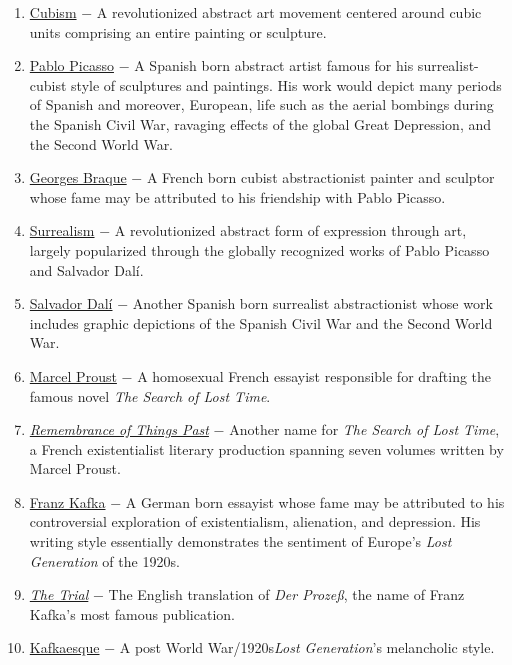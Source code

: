 \documentclass[12pt]{article}
\begin{document}
\begin{flushleft}
\begin{enumerate}
\item \underline{Cubism} $-$ A revolutionized abstract art movement centered around cubic units comprising an entire painting or sculpture.

\item \underline{Pablo Picasso} $-$ A Spanish born abstract artist famous for his surrealist-cubist style of sculptures and paintings. His work would depict many periods of Spanish and moreover, European, life such as the aerial bombings during the Spanish Civil War, ravaging effects of the global Great Depression, and the Second World War.

\item \underline{Georges Braque} $-$ A French born cubist abstractionist painter and sculptor whose fame may be attributed to his friendship with Pablo Picasso.

\item \underline{Surrealism} $-$ A revolutionized abstract form of expression through art, largely popularized through the globally recognized works of Pablo Picasso and Salvador Dal\'i. 

\item \underline{Salvador Dal\'i} $-$ Another Spanish born surrealist abstractionist whose work includes graphic depictions of the Spanish Civil War and the Second World War.

\item \underline{Marcel Proust} $-$ A homosexual French essayist responsible for drafting the famous novel \emph{The Search of Lost Time}. 

\item \underline{\emph{Remembrance of Things Past}} $-$ Another name for \emph{The Search of Lost Time}, a French existentialist literary production spanning seven volumes written by Marcel Proust.

\item \underline{Franz Kafka} $-$ A German born essayist whose fame may be attributed to his controversial exploration of existentialism, alienation, and depression. His writing style essentially demonstrates the sentiment of Europe's \emph{Lost Generation} of the 1920s.

\item \underline{\emph{The Trial}} $-$ The English translation of \emph{Der Proze\ss}, the name of Franz Kafka's most famous publication. 

\item \underline{Kafkaesque} $-$ A post World War/1920s\emph{Lost Generation}'s melancholic style.


\end{enumerate}
\end{flushleft}
\end{document}
